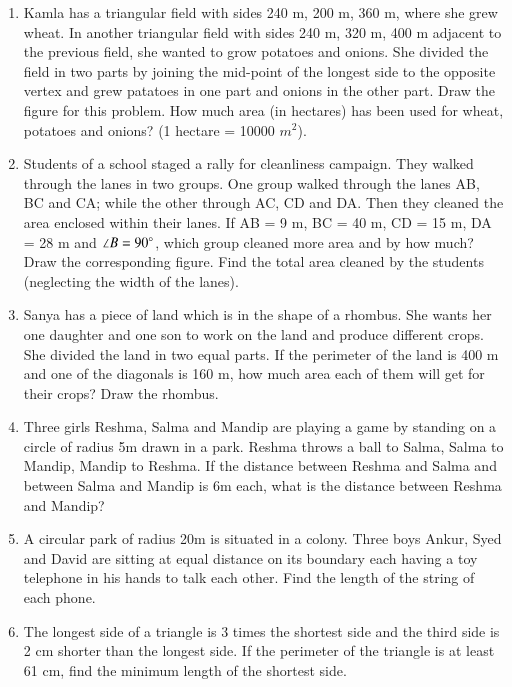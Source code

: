 \begin{enumerate}[label=\arabic*.,ref=\thesubsection.\theenumi]
\item Kamla has a triangular field with sides 240 m, 200 m, 360 m, where she grew wheat. In another triangular field with sides 240 m, 320 m, 400 m adjacent to the previous field, she wanted to grow potatoes and onions. She divided the field in two parts by joining the mid-point of the longest side to the opposite vertex and grew patatoes in one part and onions in the other part. Draw the figure for this problem.  How much area (in hectares) has been used for wheat, potatoes and onions? (1 hectare = 10000 $m^2$).
\item Students of a school staged a rally for cleanliness campaign. They walked through the lanes in two groups. One group walked through the lanes AB, BC and CA; while the other through AC, CD and DA. Then they cleaned the area enclosed within their lanes. If AB = 9 m, BC = 40 m, CD = 15 m, DA = 28 m and $\angle B = 90\degree$, which group cleaned more area and by how much? Draw the corresponding figure.  Find the total area cleaned by the students (neglecting the width of the lanes). 
%
\item Sanya has a piece of land which is in the shape of a rhombus. She wants her one daughter and one son to work on the land and produce different crops. She divided the land in two equal parts. If the perimeter of the land is 400 m and one of the diagonals is 160 m, how much area each of them will get for their crops? Draw the rhombus.
%
\item Three girls Reshma, Salma and Mandip are playing a game by standing on a circle of radius 5m drawn in a park. Reshma throws a ball to Salma, Salma to Mandip, Mandip to Reshma. If the distance between Reshma and Salma and between Salma and Mandip is 6m each, what is the distance between Reshma and Mandip?
\item A circular park of radius 20m is situated in a colony. Three boys Ankur, Syed and David are sitting at equal distance on its boundary each having a toy telephone in his hands to talk each other. Find the length of the string of each phone.
    \item The longest side of a triangle is 3 times the shortest side and the third side is 2 cm shorter than the longest side. If the perimeter of the triangle is at least 61 cm, find the minimum length of the shortest side.

\end{enumerate}
